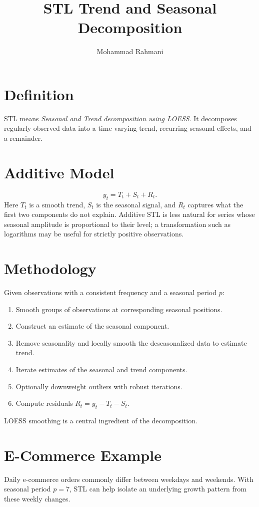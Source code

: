 \documentclass[a4paper]{article}
\title{STL Trend and Seasonal Decomposition}
\date{}
\author{Mohammad Rahmani}
\begin{document}
\maketitle

\section{Definition}
STL means \emph{Seasonal and Trend decomposition using LOESS}. It decomposes regularly observed data into a time-varying trend, recurring seasonal effects, and a remainder.

\section{Additive Model}
\[
 y_t=T_t+S_t+R_t.
\]
Here $T_t$ is a smooth trend, $S_t$ is the seasonal signal, and $R_t$ captures what the first two components do not explain. Additive STL is less natural for series whose seasonal amplitude is proportional to their level; a transformation such as logarithms may be useful for strictly positive observations.

\section{Methodology}
Given observations with a consistent frequency and a seasonal period $p$:
\begin{enumerate}
 \item Smooth groups of observations at corresponding seasonal positions.
 \item Construct an estimate of the seasonal component.
 \item Remove seasonality and locally smooth the deseasonalized data to estimate trend.
 \item Iterate estimates of the seasonal and trend components.
 \item Optionally downweight outliers with robust iterations.
 \item Compute residuals $R_t=y_t-T_t-S_t$.
\end{enumerate}
LOESS smoothing is a central ingredient of the decomposition.

\section{E-Commerce Example}
Daily e-commerce orders commonly differ between weekdays and weekends. With seasonal period $p=7$, STL can help isolate an underlying growth pattern from these weekly changes.
\end{document}
